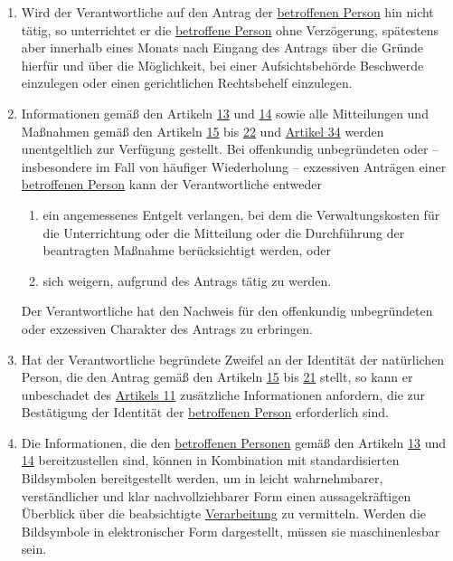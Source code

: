 \begin{enumerate}
  \item Wird der Verantwortliche auf den Antrag der \hyperref[itm:04-1]{betroffenen Person} hin nicht tätig, so unterrichtet er die
   \hyperref[itm:04-1]{betroffene Person} ohne Verzögerung, spätestens aber innerhalb eines Monats nach Eingang des Antrags über die Gründe
   hierfür und über die Möglichkeit, bei einer Aufsichtsbehörde Beschwerde einzulegen oder einen gerichtlichen
   Rechtsbehelf einzulegen.
  \label{itm:12-4}

  \item Informationen gemäß den Artikeln \hyperref[ch:13]{13} und \hyperref[ch:14]{14} sowie alle Mitteilungen und
   Maßnahmen gemäß den Artikeln \hyperref[ch:15]{15} bis \hyperref[ch:22]{22} und \hyperref[ch:34]{Artikel 34} werden
   unentgeltlich zur Verfügung gestellt. Bei offenkundig unbegründeten oder -- insbesondere im Fall von häufiger
   Wiederholung -- exzessiven Anträgen einer \hyperref[itm:04-1]{betroffenen Person} kann der Verantwortliche entweder
  \label{itm:12-5}

  \begin{enumerate}
  
    \item ein angemessenes Entgelt verlangen, bei dem die Verwaltungskosten für die Unterrichtung oder die Mitteilung
     oder die Durchführung der beantragten Maßnahme berücksichtigt werden, oder
    \label{itm:12-5a}

    \item sich weigern, aufgrund des Antrags tätig zu werden.
    \label{itm:12-5b}

  \end{enumerate}

  Der Verantwortliche hat den Nachweis für den offenkundig unbegründeten oder exzessiven Charakter des Antrags zu
  erbringen.

  \item Hat der Verantwortliche begründete Zweifel an der Identität der natürlichen Person, die den Antrag gemäß den
   Artikeln \hyperref[ch:15]{15} bis \hyperref[ch:21]{21} stellt, so kann er unbeschadet des \hyperref[ch:11]
   {Artikels 11} zusätzliche Informationen anfordern, die zur Bestätigung der Identität der \hyperref[itm:04-1]{betroffenen Person}
   erforderlich sind.
  \label{itm:12-6}

  \item Die Informationen, die den \hyperref[itm:04-1]{betroffenen Personen} gemäß den Artikeln \hyperref[ch:13]{13} und \hyperref[ch:14]
   {14} bereitzustellen sind, können in Kombination mit standardisierten Bildsymbolen bereitgestellt werden, um in
   leicht wahrnehmbarer, verständlicher und klar nachvollziehbarer Form einen aussagekräftigen Überblick über die
   beabsichtigte \hyperref[itm:04-2]{Verarbeitung} zu vermitteln. Werden die Bildsymbole in elektronischer Form dargestellt, müssen sie
   maschinenlesbar sein.
  \label{itm:12-7}


\end{enumerate}
